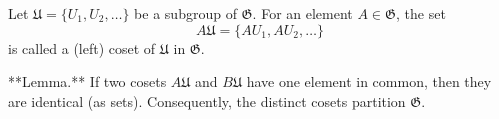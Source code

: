 Let $\mathfrak{U} = \{U_1, U_2, \ldots\}$ be a subgroup of $\mathfrak{G}$. For an element $A \in \mathfrak{G}$, the set
$$A\mathfrak{U} = \{A U_1, A U_2, \ldots\}$$
is called a (left) coset of $\mathfrak{U}$ in $\mathfrak{G}$.

**Lemma.** If two cosets $A\mathfrak{U}$ and $B\mathfrak{U}$ have one element in common, then they are identical (as sets). Consequently, the distinct cosets partition $\mathfrak{G}$.
